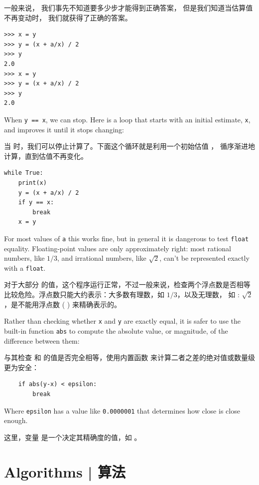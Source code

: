 一般来说， 我们事先不知道要多少步才能得到正确答案， 但是我们知道当估算值不再变动时， 我们就获得了正确的答案。


\begin{lstlisting}
>>> x = y
>>> y = (x + a/x) / 2
>>> y
2.0
>>> x = y
>>> y = (x + a/x) / 2
>>> y
2.0
\end{lstlisting}

%
When {\tt y == x}, we can stop.  Here is a loop that starts
with an initial estimate, {\tt x}, and improves it until it
stops changing:

当  时，我们可以停止计算了。下面这个循环就是利用一个初始估值 ，
循序渐进地计算，直到估值不再变化。

\begin{lstlisting}
while True:
    print(x)
    y = (x + a/x) / 2
    if y == x:
        break
    x = y
\end{lstlisting}

%
For most values of {\tt a} this works fine, but in general it is
dangerous to test {\tt float} equality.
Floating-point values are only approximately right:
most rational numbers, like $1/3$, and irrational numbers, like
$\sqrt{2}$, can't be represented exactly with a {\tt float}.
  

对于大部分  的值，这个程序运行正常，不过一般来说，检查两个浮点数是否相等比较危险。浮点数只能大约表示：大多数有理数，如 $1/3$，以及无理数，
如 : $\sqrt{2}$，是不能用浮点数 (  ) 来精确表示的。
  

Rather than checking whether {\tt x} and {\tt y} are exactly equal, it
is safer to use the built-in function {\tt abs} to compute the
absolute value, or magnitude, of the difference between them:

与其检查  和  的值是否完全相等，使用内置函数  来计算二者之差的绝对值或数量级更为安全：

\begin{lstlisting}
    if abs(y-x) < epsilon:
        break
\end{lstlisting}

%
Where \verb"epsilon" has a value like {\tt 0.0000001} that
determines how close is close enough.

这里，变量  是一个决定其精确度的值，如 。


\section{Algorithms  |  算法}
  


